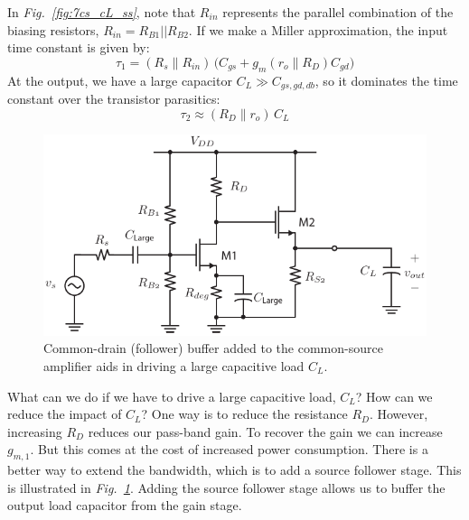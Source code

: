 In \emph{Fig.~\ref{fig:7cs_cL_ss}}, note that $R_{in}$ represents the parallel combination of the biasing resistors, $R_{in} = R_{B1} || R_{B2}$.  If we make a Miller approximation, the input time constant is given by:
    \begin{equation}
        \tau_1 = \left(R_s \parallel R_{in}\right)\,\Big(C_{gs} + g_m \left(r_o \parallel R_D\right) C_{gd}\Big)
    \end{equation}
At the output, we have a large capacitor $C_L \gg C_{gs,gd,db}$, so it dominates the time constant over the transistor parasitics:
    \begin{equation}
        \tau_2 \approx \left(R_D \parallel r_o\right)\,C_L
    \end{equation}
\newpage
\begin{figure}[t]
\centering
\includegraphics[scale=1.35]{8_cs_cd_casc_dc}
\caption{Common-drain (follower) buffer added to the common-source amplifier aids in driving a large capacitive load $C_L$.}
\label{fig:8_cs_cd_casc_dc}
\end{figure}
\vspace{1cm}
What can we do if we have to drive a large capacitive load, $C_L$?  How can we reduce the impact of $C_L$? One way is to reduce the resistance $R_D$.  However, increasing $R_D$ reduces our pass-band gain.  To recover the gain we can increase $g_{m,1}$.  But this comes at the cost of increased power consumption.  There is a better way to extend the bandwidth, which is to add a source follower stage.  This is illustrated in \emph{Fig.~\ref{fig:8_cs_cd_casc_dc}}.  Adding the source follower stage allows us to buffer the output load capacitor from the gain stage.

